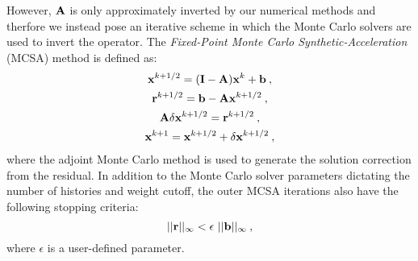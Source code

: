 However, $\mathbf{A}$ is only approximately inverted by our numerical
methods and therfore we instead pose an iterative scheme in which the
Monte Carlo solvers are used to invert the operator. The
\textit{Fixed-Point Monte Carlo Synthetic-Acceleration} (MCSA) method
is defined as:
\begin{subequations}
  \begin{gather}
    \mathbf{x}^{k+1/2} = (\mathbf{I} - \mathbf{A})\mathbf{x}^k + \mathbf{b}\:,\\
    \mathbf{r}^{k+1/2} = \mathbf{b} - \mathbf{A}\mathbf{x}^{k+1/2}\:,\\
    \mathbf{A}\delta\mathbf{x}^{k+1/2} = \mathbf{r}^{k+1/2}\:,\\
    \mathbf{x}^{k+1} = \mathbf{x}^{k+1/2} + \delta \mathbf{x}^{k+1/2}\:,
    \label{eq:mcsa}
  \end{gather}
\end{subequations}
where the adjoint Monte Carlo method is used to generate the solution
correction from the residual. In addition to the Monte Carlo solver
parameters dictating the number of histories and weight cutoff, the
outer MCSA iterations also have the following stopping criteria:
\begin{equation}
  ||\mathbf{r}||_\infty < \epsilon \ ||\mathbf{b}||_\infty\:,
  \label{eq:mcsa_stopping_criteria}
\end{equation}
where $\epsilon$ is a user-defined parameter.

